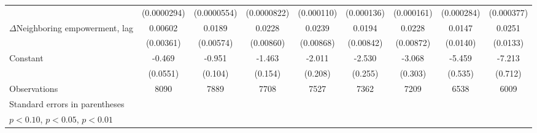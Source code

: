 \begin{table}[htbp]
\begin{tabular}{l*{8}{c}}
                    & (0.0000294)         & (0.0000554)         & (0.0000822)         &  (0.000110)         &  (0.000136)         &  (0.000161)         &  (0.000284)         &  (0.000377)         \\
[1em]
$\Delta$Neighboring empowerment, lag&     0.00602\sym{*}  &      0.0189\sym{***}&      0.0228\sym{***}&      0.0239\sym{***}&      0.0194\sym{**} &      0.0228\sym{***}&      0.0147         &      0.0251\sym{*}  \\
                    &   (0.00361)         &   (0.00574)         &   (0.00860)         &   (0.00868)         &   (0.00842)         &   (0.00872)         &    (0.0140)         &    (0.0133)         \\
[1em]
Constant            &      -0.469\sym{***}&      -0.951\sym{***}&      -1.463\sym{***}&      -2.011\sym{***}&      -2.530\sym{***}&      -3.068\sym{***}&      -5.459\sym{***}&      -7.213\sym{***}\\
                    &    (0.0551)         &     (0.104)         &     (0.154)         &     (0.208)         &     (0.255)         &     (0.303)         &     (0.535)         &     (0.712)         \\
\hline
Observations        &        8090         &        7889         &        7708         &        7527         &        7362         &        7209         &        6538         &        6009         \\
\hline\hline
\multicolumn{9}{l}{\footnotesize Standard errors in parentheses}\\
\multicolumn{9}{l}{\footnotesize \sym{*} \(p<0.10\), \sym{**} \(p<0.05\), \sym{***} \(p<0.01\)}\\
\end{tabular}
\end{table}

